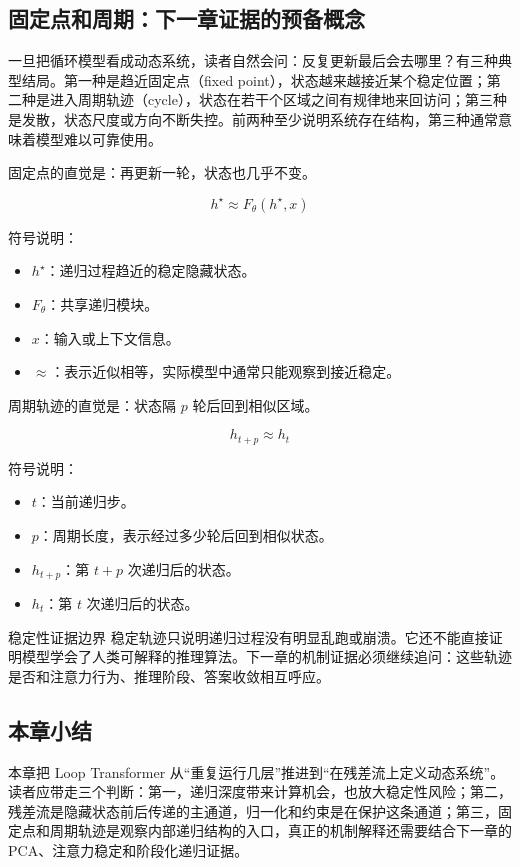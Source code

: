 \subsection{固定点和周期：下一章证据的预备概念}

一旦把循环模型看成动态系统，读者自然会问：反复更新最后会去哪里？有三种典型结局。第一种是趋近固定点（fixed point），状态越来越接近某个稳定位置；第二种是进入周期轨迹（cycle），状态在若干个区域之间有规律地来回访问；第三种是发散，状态尺度或方向不断失控。前两种至少说明系统存在结构，第三种通常意味着模型难以可靠使用。

固定点的直觉是：再更新一轮，状态也几乎不变。

\[
h^\star \approx F_\theta(h^\star,x)
\]

符号说明：
\begin{itemize}
  \item \(h^\star\)：递归过程趋近的稳定隐藏状态。
  \item \(F_\theta\)：共享递归模块。
  \item \(x\)：输入或上下文信息。
  \item \(\approx\)：表示近似相等，实际模型中通常只能观察到接近稳定。
\end{itemize}

周期轨迹的直觉是：状态隔 \(p\) 轮后回到相似区域。

\[
h_{t+p}\approx h_t
\]

符号说明：
\begin{itemize}
  \item \(t\)：当前递归步。
  \item \(p\)：周期长度，表示经过多少轮后回到相似状态。
  \item \(h_{t+p}\)：第 \(t+p\) 次递归后的状态。
  \item \(h_t\)：第 \(t\) 次递归后的状态。
\end{itemize}

\begin{warningbox}{稳定性证据边界}
稳定轨迹只说明递归过程没有明显乱跑或崩溃。它还不能直接证明模型学会了人类可解释的推理算法。下一章的机制证据必须继续追问：这些轨迹是否和注意力行为、推理阶段、答案收敛相互呼应。
\end{warningbox}

\subsection{本章小结}

本章把 Loop Transformer 从“重复运行几层”推进到“在残差流上定义动态系统”。读者应带走三个判断：第一，递归深度带来计算机会，也放大稳定性风险；第二，残差流是隐藏状态前后传递的主通道，归一化和约束是在保护这条通道；第三，固定点和周期轨迹是观察内部递归结构的入口，真正的机制解释还需要结合下一章的 PCA、注意力稳定和阶段化递归证据。
